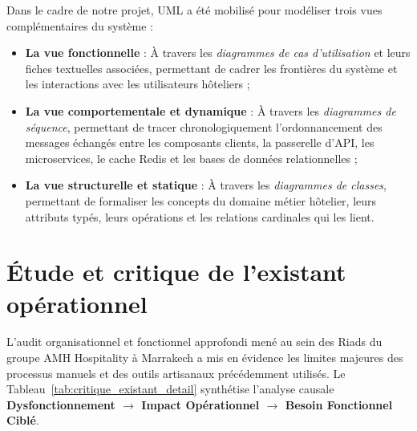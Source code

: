 Dans le cadre de notre projet, UML a été mobilisé pour modéliser trois vues complémentaires du système :
\begin{itemize}
    \item \textbf{La vue fonctionnelle} : À travers les \textit{diagrammes de cas d'utilisation} et leurs fiches textuelles associées, permettant de cadrer les frontières du système et les interactions avec les utilisateurs hôteliers ;
    \item \textbf{La vue comportementale et dynamique} : À travers les \textit{diagrammes de séquence}, permettant de tracer chronologiquement l'ordonnancement des messages échangés entre les composants clients, la passerelle d'API, les microservices, le cache Redis et les bases de données relationnelles ;
    \item \textbf{La vue structurelle et statique} : À travers les \textit{diagrammes de classes}, permettant de formaliser les concepts du domaine métier hôtelier, leurs attributs typés, leurs opérations et les relations cardinales qui les lient.
\end{itemize}

\section{Étude et critique de l'existant opérationnel}

L'audit organisationnel et fonctionnel approfondi mené au sein des Riads du groupe AMH Hospitality à Marrakech a mis en évidence les limites majeures des processus manuels et des outils artisanaux précédemment utilisés. Le Tableau~\ref{tab:critique_existant_detail} synthétise l'analyse causale \textbf{Dysfonctionnement $\rightarrow$ Impact Opérationnel $\rightarrow$ Besoin Fonctionnel Ciblé}.

